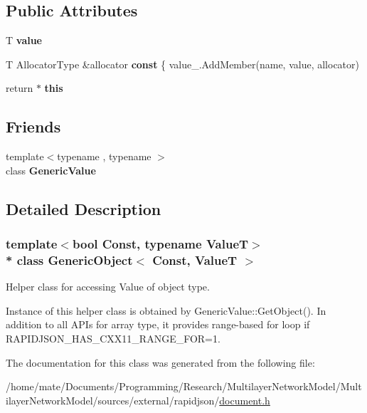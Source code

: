 \subsection*{Public Attributes}
\begin{DoxyCompactItemize}
\item 
T {\bfseries value}\hypertarget{classGenericObject_a131538fbbacbc0a3a5ad15dbea66394f}{}\label{classGenericObject_a131538fbbacbc0a3a5ad15dbea66394f}

\item 
T Allocator\+Type \&allocator {\bfseries const} \{ value\+\_\+.\+Add\+Member(name, value, allocator)\hypertarget{classGenericObject_af70c9646b5e422306c33e98b3d8783a7}{}\label{classGenericObject_af70c9646b5e422306c33e98b3d8783a7}

\item 
return $\ast$ {\bfseries this}\hypertarget{classGenericObject_a719a0e5501da825e6f86ce12b46446cb}{}\label{classGenericObject_a719a0e5501da825e6f86ce12b46446cb}

\end{DoxyCompactItemize}
\subsection*{Friends}
\begin{DoxyCompactItemize}
\item 
{\footnotesize template$<$typename , typename $>$ }\\class {\bfseries Generic\+Value}\hypertarget{classGenericObject_a899449e1a645b5e377af059fb61113d8}{}\label{classGenericObject_a899449e1a645b5e377af059fb61113d8}

\end{DoxyCompactItemize}


\subsection{Detailed Description}
\subsubsection*{template$<$bool Const, typename ValueT$>$\\*
class Generic\+Object$<$ Const, Value\+T $>$}

Helper class for accessing Value of object type. 

Instance of this helper class is obtained by {\ttfamily Generic\+Value\+::\+Get\+Object()}. In addition to all A\+P\+Is for array type, it provides range-\/based for loop if {\ttfamily R\+A\+P\+I\+D\+J\+S\+O\+N\+\_\+\+H\+A\+S\+\_\+\+C\+X\+X11\+\_\+\+R\+A\+N\+G\+E\+\_\+\+F\+OR=1}. 

The documentation for this class was generated from the following file\+:\begin{DoxyCompactItemize}
\item 
/home/mate/\+Documents/\+Programming/\+Research/\+Multilayer\+Network\+Model/\+Multilayer\+Network\+Model/sources/external/rapidjson/\hyperlink{document_8h}{document.\+h}\end{DoxyCompactItemize}
